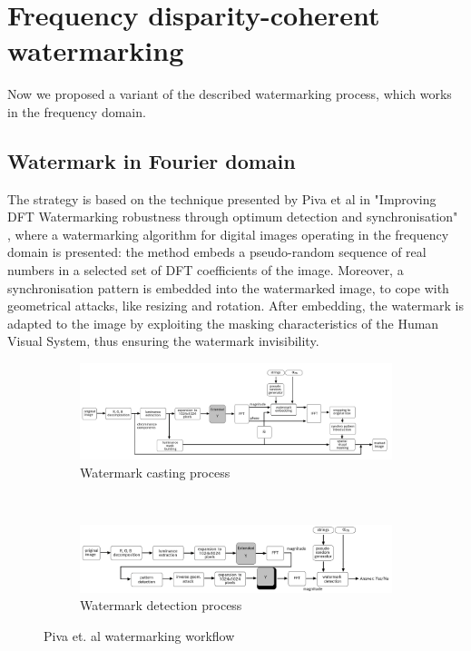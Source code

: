 \chapter{Frequency disparity-coherent watermarking}
\label{dft}

Now we proposed a variant of the described watermarking process, which works in the frequency domain.

\section{Watermark in Fourier domain}

The strategy is based on the technique presented by Piva et al in "Improving DFT Watermarking robustness through optimum detection and synchronisation" \cite{PIVA}, where a watermarking algorithm for digital images operating in the frequency domain is presented: the method embeds a pseudo-random sequence of real numbers in a selected set of DFT coefficients of the image. Moreover, a synchronisation pattern is embedded into the watermarked image, to cope with geometrical attacks, like resizing and rotation. After embedding, the watermark is adapted to the image by exploiting the masking characteristics of the Human Visual System, thus ensuring the watermark invisibility.\newline
\begin{figure}[h!]
\centering
\begin{subfigure}[]{\textwidth}
\centering
\includegraphics[width=1\textwidth]{./img/casting.png}
\caption{\scriptsize{Watermark casting process}\label{fig:cast}}
\end{subfigure} 
~\quad
\begin{subfigure}[]{\textwidth}
\centering
\includegraphics[width=1\textwidth]{./img/detection.png}
\caption{\scriptsize{Watermark detection process}\label{fig:det}}
\end{subfigure}%
\caption{\small{Piva et. al watermarking workflow}\label{fig:blocchi}}
\end{figure}

